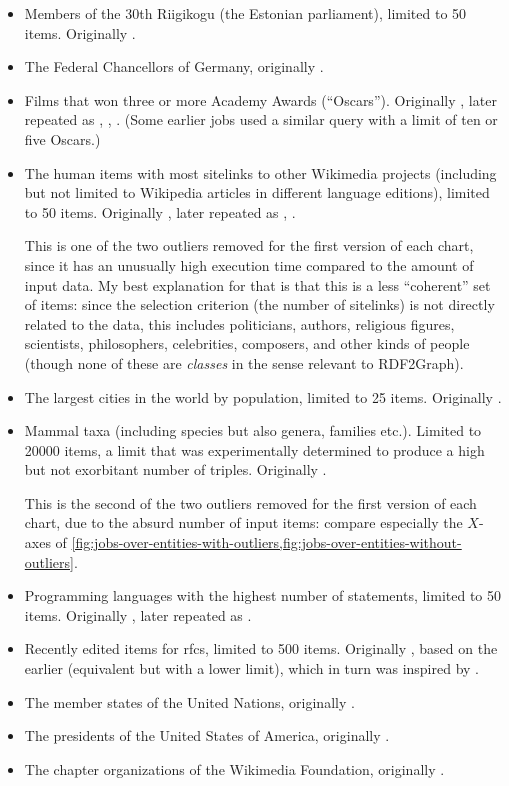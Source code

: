 \begin{itemize}
\item Members of the 30th Riigikogu (the Estonian parliament),
  limited to 50 \glspl{item}.
  Originally .
\item The Federal Chancellors of Germany,
  originally .
\item Films that won three or more Academy Awards (“Oscars”). %
  Originally , later repeated as , , .
  (Some earlier jobs used a similar query with a limit of ten or five Oscars.)
\item The human \glspl{item} with most \glspl{sitelink} to other \gls{Wikimedia} projects
  (including but not limited to \gls{Wikipedia} articles in different language editions),
  limited to 50 \glspl{item}.
  Originally , later repeated as , .

  This is one of the two outliers removed for the first version of each chart,
  since it has an unusually high execution time compared to the amount of input data.
  My best explanation for that is that this is a less “coherent” set of \glspl{item}:
  since the selection criterion (the number of sitelinks) is not directly related to the data,
  this includes politicians, authors, religious figures, scientists, philosophers, celebrities, composers, and other kinds of people
  (though none of these are \emph{classes} in the sense relevant to \gls{RDF2Graph}).
\item The largest cities in the world by population,
  limited to 25 \glspl{item}.
  Originally .
\item Mammal taxa (including species but also genera, families etc.).
  Limited to \num{20000} \glspl{item},
  a limit that was experimentally determined to produce a high but not exorbitant number of triples.
  Originally .

  This is the second of the two outliers removed for the first version of each chart,
  due to the absurd number of input \glspl{item}:
  compare especially the $X$-axes of
  \cref{fig:jobs-over-entities-with-outliers,fig:jobs-over-entities-without-outliers}.
\item Programming languages with the highest number of \glspl{statement},
  limited to 50 \glspl{item}.
  Originally , later repeated as .
\item Recently edited \glspl{item} for \glspl{rfc},
  limited to 500 \glspl{item}.
  Originally , based on the earlier  (equivalent but with a lower limit),
  which in turn was inspired by .
\item The member states of the United Nations,
  originally .
\item The presidents of the United States of America,
  originally .
\item The chapter organizations of the \gls{Wikimedia Foundation},
  originally .
\end{itemize}

